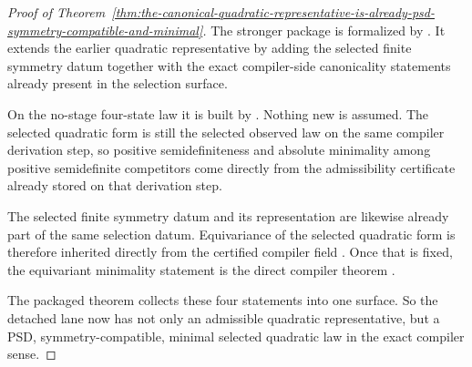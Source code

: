 \begin{proof}[Proof of Theorem~\ref{thm:the-canonical-quadratic-representative-is-already-psd-symmetry-compatible-and-minimal}]
\label{proof:thm:the-canonical-quadratic-representative-is-already-psd-symmetry-compatible-and-minimal}
The stronger package is formalized by
. It extends the earlier
quadratic representative by adding the selected finite symmetry datum together
with the exact compiler-side canonicality statements already present in the
selection surface.

On the no-stage four-state law it is built by
.
Nothing new is assumed. The selected quadratic form is still the selected
observed law on the same compiler derivation step, so positive semidefiniteness
and absolute minimality among positive semidefinite competitors come directly
from the admissibility certificate already stored on that derivation step.

The selected finite symmetry datum and its representation are likewise already
part of the same selection datum. Equivariance of the selected quadratic form
is therefore inherited directly from the certified compiler field
. Once that is fixed, the equivariant minimality
statement is the direct compiler theorem
.

The packaged theorem
collects these four statements into one surface. So the detached lane now has
not only an admissible quadratic representative, but a PSD, symmetry-compatible,
minimal selected quadratic law in the exact compiler sense.
\end{proof}

